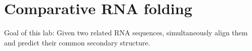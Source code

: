 \chapter{Comparative RNA folding}

Goal of this lab:
Given two related RNA sequences, simultaneously align them and predict their common secondary structure.

